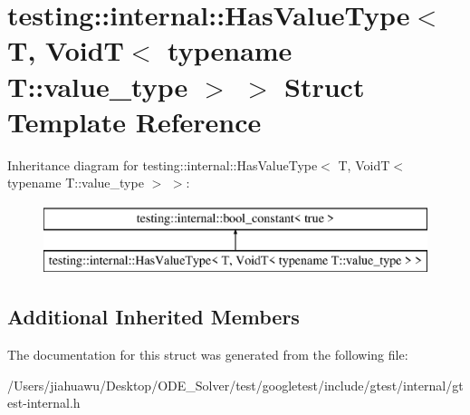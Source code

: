\hypertarget{structtesting_1_1internal_1_1_has_value_type_3_01_t_00_01_void_t_3_01typename_01_t_1_1value__type_01_4_01_4}{}\section{testing\+:\+:internal\+:\+:Has\+Value\+Type$<$ T, VoidT$<$ typename T\+:\+:value\+\_\+type $>$ $>$ Struct Template Reference}
\label{structtesting_1_1internal_1_1_has_value_type_3_01_t_00_01_void_t_3_01typename_01_t_1_1value__type_01_4_01_4}
Inheritance diagram for testing\+:\+:internal\+:\+:Has\+Value\+Type$<$ T, VoidT$<$ typename T\+:\+:value\+\_\+type $>$ $>$\+:\begin{figure}[H]
\begin{center}
\leavevmode
\includegraphics[height=2.000000cm]{structtesting_1_1internal_1_1_has_value_type_3_01_t_00_01_void_t_3_01typename_01_t_1_1value__type_01_4_01_4}
\end{center}
\end{figure}
\subsection*{Additional Inherited Members}


The documentation for this struct was generated from the following file\+:\begin{DoxyCompactItemize}
\item 
/\+Users/jiahuawu/\+Desktop/\+O\+D\+E\+\_\+\+Solver/test/googletest/include/gtest/internal/gtest-\/internal.\+h\end{DoxyCompactItemize}
